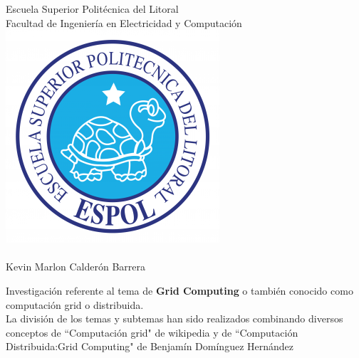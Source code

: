 \documentclass[12pt]{article}
\begin{document}
{\centering
{\Large{Escuela Superior Polit\'ecnica del Litoral\\Facultad de Ingenier\'ia en Electricidad y Computaci\'on\\}}
\vspace{0.6in}
\includegraphics[scale=0.5]{espol.png}\\
\vspace{0.8in}
{\LARGE \textbf{\color{blue}{Grid Computing\\ Computaci\'on Distribuida}}\\
\vspace{0.5in}
\large{Kevin Marlon Calder\'on Barrera}
}

\newpage
{\raggedright
Investigaci\'on referente al tema de {\textbf{Grid Computing}} o tambi\'en conocido como computaci\'on grid o distribuida.\\
La divisi\'on de los temas y subtemas han sido realizados combinando diversos conceptos de ``Computaci\'on grid" de wikipedia y de ``Computaci\'on Distribuida:Grid Computing" de Benjam\'in Dom\'inguez Hern\'andez
}

\tableofcontents


\newpage
}
\end{document}
